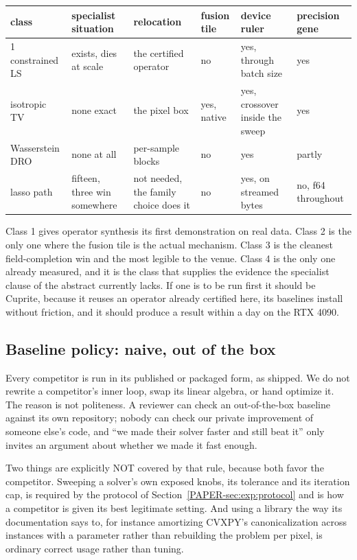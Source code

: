 \documentclass[11pt]{article}
\begin{document}
\begin{center}\small
\begin{tabular}{@{}p{2.05cm}p{2.65cm}p{2.65cm}p{1.85cm}p{2.65cm}p{2.15cm}@{}}
\toprule
class & specialist situation & relocation & fusion tile & device ruler &
precision gene \\
\midrule
1 constrained LS & exists, dies at scale & the certified operator & no &
yes, through batch size & yes \\
\addlinespace
2 isotropic TV & none exact & the pixel box & yes, native & yes, crossover
inside the sweep & yes \\
\addlinespace
3 Wasserstein DRO & none at all & per-sample blocks & no & yes & partly \\
\addlinespace
4 lasso path & fifteen, three win somewhere & not needed, the family choice
does it & no & yes, on streamed bytes & no, f64 throughout \\
\bottomrule
\end{tabular}
\end{center}

Class 1 gives operator synthesis its first demonstration on real data. Class 2
is the only one where the fusion tile is the actual mechanism. Class 3 is the
cleanest field-completion win and the most legible to the venue. Class 4 is the
only one already measured, and it is the class that supplies the evidence the
specialist clause of the abstract currently lacks. If one is to be run first it
should be Cuprite, because it reuses an operator already certified here, its
baselines install without friction, and it should produce a result within a day
on the RTX 4090.


\subsection{Baseline policy: naive, out of the box}
\label{app:log:baselinepolicy}

Every competitor is run in its published or packaged form, as shipped. We do
not rewrite a competitor's inner loop, swap its linear algebra, or hand
optimize it. The reason is not politeness. A reviewer can check an
out-of-the-box baseline against its own repository; nobody can check our
private improvement of someone else's code, and ``we made their solver faster
and still beat it'' only invites an argument about whether we made it fast
enough.

Two things are explicitly NOT covered by that rule, because both favor the
competitor. Sweeping a solver's own exposed knobs, its tolerance and its
iteration cap, is required by the protocol of
Section~\ref{PAPER-sec:exp:protocol} and is how a competitor is given its
best legitimate setting. And using a library the way its documentation says
to, for instance amortizing CVXPY's canonicalization across instances with a
parameter rather than rebuilding the problem per pixel, is ordinary correct
usage rather than tuning.
\end{document}
